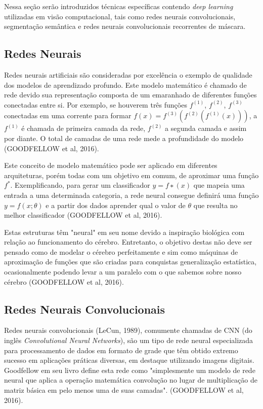 \documentclass[12pt]{report}
\begin{document}
Nessa seção serão introduzidos técnicas específicas contendo \textit{deep learning} utilizadas em visão computacional, tais como redes neurais convolucionais, segmentação semântica e redes neurais convolucionais recorrentes de máscara. 

\subsection{Redes Neurais}

Redes neurais artificiais são consideradas por excelência o exemplo de qualidade dos modelos de aprendizado profundo. Este modelo matemático é chamado de rede devido sua representação composta de um emaranhado de diferentes funções conectadas entre si. Por exemplo, se houverem três funções $f^{(1)}$, $f^{(2)}$, $f^{(3)}$ conectadas em uma corrente para formar $f(x) = f^{(3)}(f^{(2)}(f^{(1)}(x)))$, a $f^{(1)}$ é chamada de primeira camada da rede, $f^{(2)}$ a segunda camada e assim por diante. O total de camadas de uma rede mede a profundidade do modelo (GOODFELLOW et al, 2016).

Este conceito de modelo matemático pode ser aplicado em diferentes arquiteturas, porém todas com um objetivo em comum, de aproximar uma função $f^*$. Exemplificando, para gerar um classificador $y = f∗(x)$ que mapeia uma entrada a uma determinada categoria, a rede neural consegue definirá uma função $y = f(x;\theta)$ e a partir dos dados aprender qual o valor de $\theta$ que resulta no melhor classificador (GOODFELLOW et al, 2016).

Estas estruturas têm "neural" em seu nome devido a inspiração biológica com relação ao funcionamento do cérebro. Entretanto, o objetivo destas não deve ser pensado como de modelar o cérebro perfeitamente e sim como máquinas de aproximação de funções que são criadas para conquistas generalização estatística, ocasionalmente podendo levar a um paralelo com o que sabemos sobre nosso cérebro (GOODFELLOW et al, 2016).


\subsection{Redes Neurais Convolucionais}

Redes neurais convolucionais (LeCun, 1989), comumente chamadas de CNN (do inglês \textit{Convolutional Neural Networks}), são um tipo de rede neural especializada para processamento de dados em formato de grade que têm obtido extremo sucesso em aplicações práticas diversas, em destaque utilizando imagens digitais. Goodfellow em seu livro define esta rede como "simplesmente um modelo de rede neural que aplica a operação matemática convolução no lugar de multiplicação de matriz básica em pelo menos uma de suas camadas".  (GOODFELLOW et al, 2016).
\end{document}
